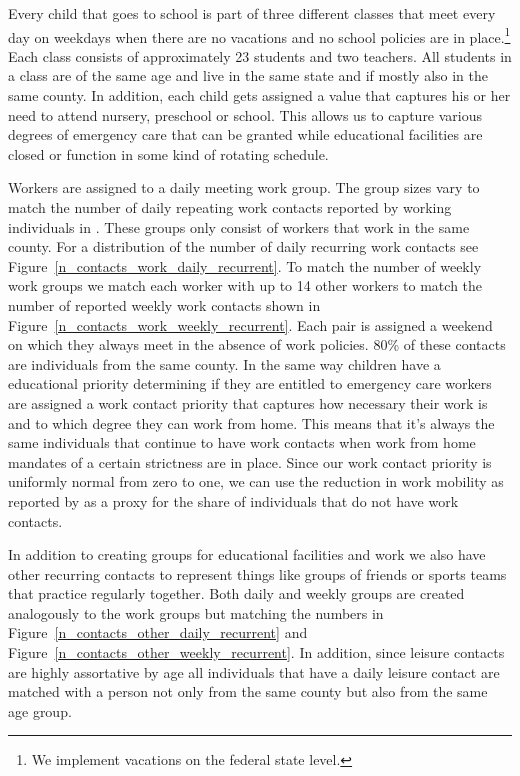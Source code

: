 Every child that goes to school is part of three different classes that meet every day on
weekdays when there are no vacations and no school policies are in place.\footnote{We
implement vacations on the federal state level.} Each class consists of approximately 23
students \citep{OECD2013} and two teachers. All students in a class are of the same age
and live in the same state and if mostly also in the same county. In addition, each
child gets assigned a value that captures his or her need to attend nursery, preschool or
school. This allows us to capture various degrees of emergency care that can be granted
while educational facilities are closed or function in some kind of rotating schedule.

Workers are assigned to a daily meeting work group. The group sizes vary to match the
number of daily repeating work contacts reported by working individuals in
\cite{Mossong2008}. These groups only consist of workers that work in the same county.
For a distribution of the number of daily recurring work contacts see
Figure~\ref{n_contacts_work_daily_recurrent}. To match the number of weekly work groups
we match each worker with up to 14 other workers to match the number of reported weekly
work contacts shown in Figure~\ref{n_contacts_work_weekly_recurrent}. Each pair is
assigned a weekend on which they always meet in the absence of work policies. 80\% of
these contacts are individuals from the same county.
In the same way children have a educational priority determining if they are entitled to
emergency care workers are assigned a work contact priority that captures how necessary
their work is and to which degree they can work from home. This means that it's always
the same individuals that continue to have work contacts when work from home mandates of
a certain strictness are in place. Since our work contact priority is uniformly normal
from zero to one, we can use the reduction in work mobility as reported by
\cite{Google2021} as a proxy for the share of individuals that do not have work contacts.

In addition to creating groups for educational facilities and work we also have other
recurring contacts to represent things like groups of friends or sports teams that
practice regularly together. Both daily and weekly groups are created analogously to the
work groups but matching the numbers in Figure~\ref{n_contacts_other_daily_recurrent} and
Figure~\ref{n_contacts_other_weekly_recurrent}. In addition, since leisure contacts are
highly assortative by age all individuals that have a daily leisure contact are matched
with a person not only from the same county but also from the same age group.

